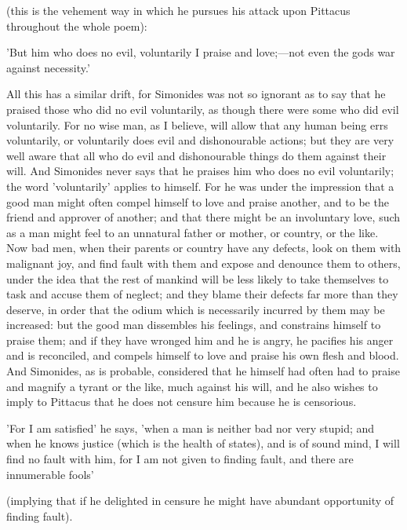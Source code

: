 \documentclass[11pt,letter]{article}
\begin{document}
\par  (this is the vehement way in which he pursues his attack upon Pittacus throughout the whole poem):

\par  'But him who does no evil, voluntarily I praise and love;—not even the gods war against necessity.'

\par  All this has a similar drift, for Simonides was not so ignorant as to say that he praised those who did no evil voluntarily, as though there were some who did evil voluntarily. For no wise man, as I believe, will allow that any human being errs voluntarily, or voluntarily does evil and dishonourable actions; but they are very well aware that all who do evil and dishonourable things do them against their will. And Simonides never says that he praises him who does no evil voluntarily; the word 'voluntarily' applies to himself. For he was under the impression that a good man might often compel himself to love and praise another, and to be the friend and approver of another; and that there might be an involuntary love, such as a man might feel to an unnatural father or mother, or country, or the like. Now bad men, when their parents or country have any defects, look on them with malignant joy, and find fault with them and expose and denounce them to others, under the idea that the rest of mankind will be less likely to take themselves to task and accuse them of neglect; and they blame their defects far more than they deserve, in order that the odium which is necessarily incurred by them may be increased: but the good man dissembles his feelings, and constrains himself to praise them; and if they have wronged him and he is angry, he pacifies his anger and is reconciled, and compels himself to love and praise his own flesh and blood. And Simonides, as is probable, considered that he himself had often had to praise and magnify a tyrant or the like, much against his will, and he also wishes to imply to Pittacus that he does not censure him because he is censorious.

\par  'For I am satisfied' he says, 'when a man is neither bad nor very stupid; and when he knows justice (which is the health of states), and is of sound mind, I will find no fault with him, for I am not given to finding fault, and there are innumerable fools'

\par  (implying that if he delighted in censure he might have abundant opportunity of finding fault).
\end{document}
